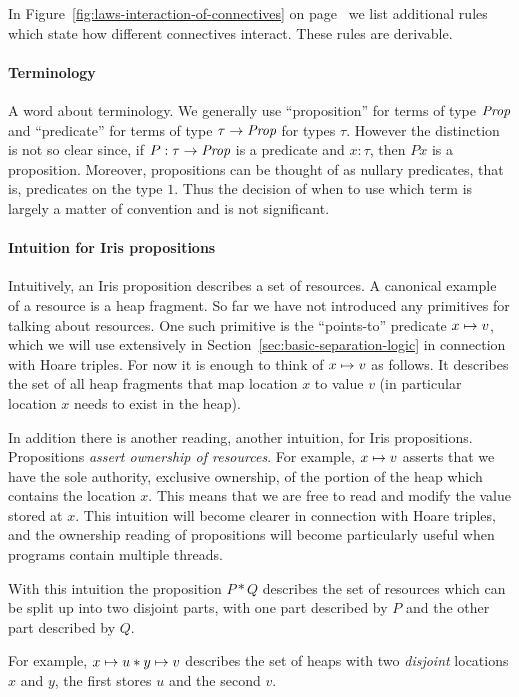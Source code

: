 In Figure~\ref{fig:laws-interaction-of-connectives} on page~\pageref{fig:laws-interaction-of-connectives} we list additional rules which state how different connectives interact.
These rules are derivable.

\paragraph{Terminology}
A word about terminology.
We generally use ``proposition'' for terms of type $\textit{Prop}$ and ``predicate'' for terms of type $\tau \to \textit{Prop}$ for types $\tau$.
However the distinction is not so clear since, if $P : \tau \to \textit{Prop}$ is a predicate and $x : \tau$, then $P x$ is a proposition.
Moreover, propositions can be thought of as nullary predicates, that is, predicates on the type $1$.
Thus the decision of when to use which term is largely a matter of convention and is not significant.

\paragraph{Intuition for Iris propositions}
Intuitively, an Iris proposition describes a set of resources.
A canonical example of a resource is a heap fragment.
So far we have not introduced any primitives for talking about resources.
One such primitive is the ``points-to'' predicate $x \mapsto v$,
which we will use extensively in Section~\ref{sec:basic-separation-logic} in connection with Hoare triples.
For now it is enough to think of $x\mapsto v$ as follows.
It describes the set of all heap fragments that map location $x$ to
value $v$ (in particular location $x$ needs to exist in the heap).

In addition there is another reading, another intuition, for Iris propositions.
Propositions \emph{assert ownership of resources}.
For example, $x \mapsto v$ asserts that we have the sole authority, \ie{} exclusive ownership, of the portion of the heap which contains the location $x$.
This means that we are free to read and modify the value stored at $x$.
This intuition will become clearer in connection with Hoare triples, and the ownership reading of propositions will become particularly useful when programs contain multiple threads.

With this intuition the proposition $P\ast Q$ describes the set of resources which can be split up into two disjoint parts, with one part described by $P$ and the other part described by $Q$.

For example, $x\mapsto u \ast y \mapsto v$ describes the set of heaps with two \emph{disjoint} locations $x$ and $y$, the first stores $u$ and the second $v$.

